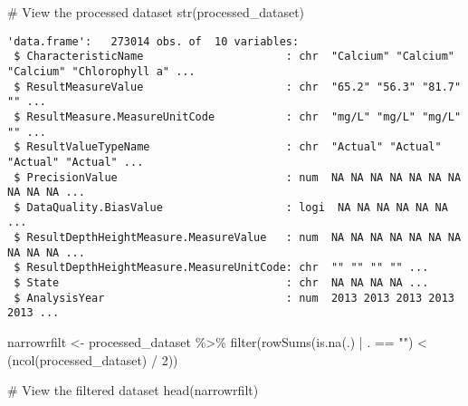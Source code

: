 \documentclass[
  12pt,
]{article}
\newenvironment{Shaded}{\begin{snugshade}}{\end{snugshade}}
\newcommand{\CommentTok}[1]{\textcolor[rgb]{0.37,0.37,0.37}{#1}}
\newcommand{\DecValTok}[1]{\textcolor[rgb]{0.68,0.00,0.00}{#1}}
\newcommand{\FunctionTok}[1]{\textcolor[rgb]{0.28,0.35,0.67}{#1}}
\newcommand{\NormalTok}[1]{\textcolor[rgb]{0.00,0.23,0.31}{#1}}
\newcommand{\OtherTok}[1]{\textcolor[rgb]{0.00,0.23,0.31}{#1}}
\newcommand{\SpecialCharTok}[1]{\textcolor[rgb]{0.37,0.37,0.37}{#1}}
\newcommand{\StringTok}[1]{\textcolor[rgb]{0.13,0.47,0.30}{#1}}
\begin{document}
\begin{Shaded}
\begin{Highlighting}[]
\CommentTok{\# View the processed dataset}
\FunctionTok{str}\NormalTok{(processed\_dataset)}
\end{Highlighting}
\end{Shaded}

\begin{verbatim}
'data.frame':   273014 obs. of  10 variables:
 $ CharacteristicName                      : chr  "Calcium" "Calcium" "Calcium" "Chlorophyll a" ...
 $ ResultMeasureValue                      : chr  "65.2" "56.3" "81.7" "" ...
 $ ResultMeasure.MeasureUnitCode           : chr  "mg/L" "mg/L" "mg/L" "" ...
 $ ResultValueTypeName                     : chr  "Actual" "Actual" "Actual" "Actual" ...
 $ PrecisionValue                          : num  NA NA NA NA NA NA NA NA NA NA ...
 $ DataQuality.BiasValue                   : logi  NA NA NA NA NA NA ...
 $ ResultDepthHeightMeasure.MeasureValue   : num  NA NA NA NA NA NA NA NA NA NA ...
 $ ResultDepthHeightMeasure.MeasureUnitCode: chr  "" "" "" "" ...
 $ State                                   : chr  NA NA NA NA ...
 $ AnalysisYear                            : num  2013 2013 2013 2013 2013 ...
\end{verbatim}

\begin{Shaded}
\begin{Highlighting}[]
\NormalTok{narrowrfilt }\OtherTok{\textless{}{-}}\NormalTok{ processed\_dataset }\SpecialCharTok{\%\textgreater{}\%}
  \FunctionTok{filter}\NormalTok{(}\FunctionTok{rowSums}\NormalTok{(}\FunctionTok{is.na}\NormalTok{(.) }\SpecialCharTok{|}\NormalTok{ . }\SpecialCharTok{==} \StringTok{""}\NormalTok{) }\SpecialCharTok{\textless{}}\NormalTok{ (}\FunctionTok{ncol}\NormalTok{(processed\_dataset) }\SpecialCharTok{/} \DecValTok{2}\NormalTok{))}

\CommentTok{\# View the filtered dataset}
\FunctionTok{head}\NormalTok{(narrowrfilt)}
\end{Highlighting}
\end{Shaded}
\end{document}
